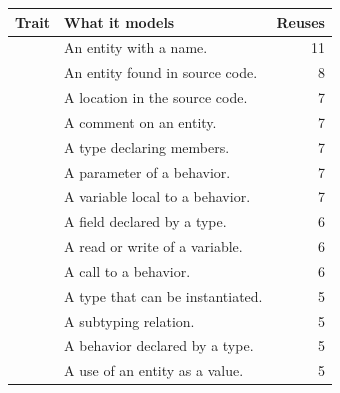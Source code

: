 \begin{tabular}{llr}
\toprule
Trait & What it models & Reuses \\
\midrule
\ct{TNamedEntity} & An entity with a name. & 11 \\
\ct{TSourceEntity} & An entity found in source code. & 8 \\
\ct{TSourceAnchor} & A location in the source code. & 7 \\
\ct{TComment} & A comment on an entity. & 7 \\
\ct{TType} & A type declaring members. & 7 \\
\ct{TParameter} & A parameter of a behavior. & 7 \\
\ct{TLocalVariable} & A variable local to a behavior. & 7 \\
\ct{TAttribute} & A field declared by a type. & 6 \\
\ct{TAccess} & A read or write of a variable. & 6 \\
\ct{TInvocation} & A call to a behavior. & 6 \\
\ct{TClass} & A type that can be instantiated. & 5 \\
\ct{TInheritance} & A subtyping relation. & 5 \\
\ct{TMethod} & A behavior declared by a type. & 5 \\
\ct{TReference} & A use of an entity as a value. & 5 \\
\bottomrule
\end{tabular}
